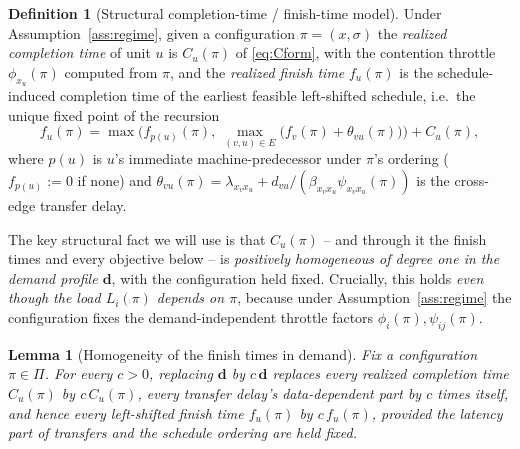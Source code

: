 \documentclass{amsart}
\newtheorem{lemma}{Lemma}
\theoremstyle{definition}
\newtheorem{definition}{Definition}
\begin{document}
\begin{definition}[Structural completion-time / finish-time model]\label{def:struct}
Under Assumption~\ref{ass:regime}, given a configuration $\pi=(x,\sigma)$ the
\emph{realized completion time} of unit $u$ is $C_u(\pi)$ of \eqref{eq:Cform},
with the contention throttle $\phi_{x_u}(\pi)$ computed from $\pi$, and the
\emph{realized finish time} $f_u(\pi)$ is the schedule-induced completion time
of the earliest feasible left-shifted schedule, i.e.\ the unique fixed point of
the recursion
\begin{equation}\label{eq:recurdef}
f_u(\pi)=\max\Big(f_{p(u)}(\pi),\ \max_{(v,u)\in E}\big(f_v(\pi)+\theta_{vu}(\pi)\big)\Big)+C_u(\pi),
\end{equation}
where $p(u)$ is $u$'s immediate machine-predecessor under $\pi$'s ordering
($f_{p(u)}:=0$ if none) and $\theta_{vu}(\pi)=\lambda_{x_vx_u}+
d_{vu}/(\beta_{x_vx_u}\psi_{x_vx_u}(\pi))$ is the cross-edge transfer delay.
\end{definition}

The key structural fact we will use is that $C_u(\pi)$ -- and through it the
finish times and every objective below -- is \emph{positively homogeneous of
degree one in the demand profile $\mathbf d$}, with the configuration held
fixed. Crucially, this holds \emph{even though the load $L_i(\pi)$ depends on
$\pi$}, because under Assumption~\ref{ass:regime} the configuration fixes the
demand-independent throttle factors $\phi_i(\pi),\psi_{ij}(\pi)$.

\begin{lemma}[Homogeneity of the finish times in demand]\label{lem:homog}
Fix a configuration $\pi\in\Pi$. For every $c>0$, replacing $\mathbf d$ by
$c\,\mathbf d$ replaces every realized completion time $C_u(\pi)$ by
$c\,C_u(\pi)$, every transfer delay's data-dependent part by $c$ times itself,
and hence every left-shifted finish time $f_u(\pi)$ by $c\,f_u(\pi)$, provided
the latency part of transfers and the schedule \emph{ordering} are held fixed.
\end{lemma}
\end{document}
